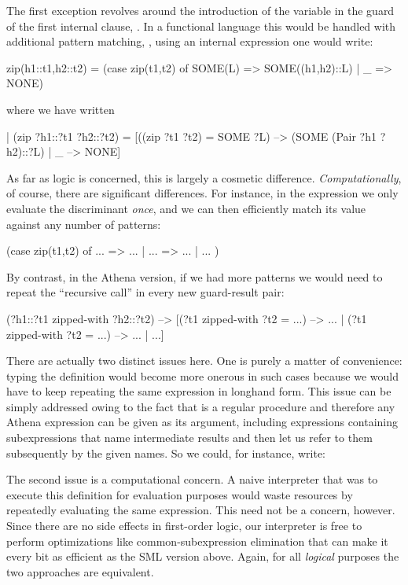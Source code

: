 The first exception revolves around the introduction of the variable  in the 
guard of the first internal clause, .
In a functional language this would be handled with additional pattern matching,
\egnsp, using an internal  expression one would write:
\begin{tcAthena}
zip(h1::t1,h2::t2) = (case zip(t1,t2) of
                        SOME(L) => SOME((h1,h2)::L)
                      | _ => NONE)
\end{tcAthena}
where we have written
\begin{tcAthena}
| (zip ?h1::?t1 ?h2::?t2) = 
       [((zip ?t1 ?t2) = SOME ?L) --> (SOME (Pair ?h1 ?h2)::?L)
      | _ --> NONE]
\end{tcAthena}
As far as logic is concerned, this is largely a cosmetic difference. 
{\em Computationally}, of course, there are significant
differences. For instance, in the  expression we only evaluate 
the discriminant  {\em once}, and we can then efficiently
match its value against any number of patterns: 
\begin{tcAthena}
(case zip(t1,t2) of
   ... => ...
 | ... => ... 
 |  ...
)
\end{tcAthena}
By contrast, in the Athena version, if we had more patterns we would need to repeat 
the ``recursive call''  in every new guard-result pair:
\begin{tcAthena}
(?h1::?t1 zipped-with ?h2::?t2) -->
     [(?t1 zipped-with ?t2 = ...) --> ...
    | (?t1 zipped-with ?t2 = ...) --> ...
    |  ...]
\end{tcAthena}
There are actually two distinct issues here. One is purely a matter of convenience: 
typing the definition would become more onerous in such cases because we would have to 
keep repeating the same expression in longhand form. This issue can be simply addressed 
owing to the fact that  is a regular procedure and therefore
any Athena expression can be given as its argument, including expressions containing
subexpressions that name intermediate results and then let us refer to them 
subsequently by the given names.
So we could, for instance, write:
\begin{tcAthena}
(?h1::?t1 zipped-with ?h2::?t2) -->
    let {tail-result := (?t1 zipped-with ?t2)
      [(tail-result = ...) --> ...
     | (tail-result = ...) --> ...
     |  ...]
\end{tcAthena}
The second issue is a computational concern. A naive interpreter 
that was to execute this definition for evaluation purposes would
waste resources by repeatedly evaluating the same expression. 
This need not be a concern, however. Since there are no side effects 
in first-order logic, our interpreter is free to perform optimizations
like common-subexpression elimination that can make it every bit 
as efficient as the SML version above. Again, for all {\em logical\/} 
purposes the two approaches are equivalent. 

